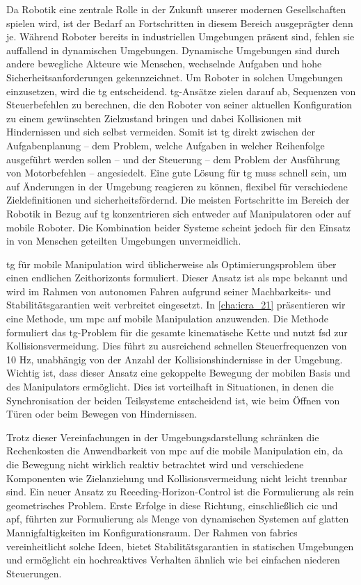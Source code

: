 \acresetall
Da Robotik eine zentrale Rolle in der Zukunft unserer modernen Gesellschaften
spielen wird, ist der Bedarf an Fortschritten in diesem Bereich ausgeprägter
denn je. Während Roboter bereits in industriellen Umgebungen präsent sind,
fehlen sie auffallend in dynamischen Umgebungen. Dynamische Umgebungen sind
durch andere bewegliche Akteure wie Menschen, wechselnde Aufgaben und hohe
Sicherheitsanforderungen gekennzeichnet. Um Roboter in solchen Umgebungen
einzusetzen, wird die \ac{tg} entscheidend. \Ac{tg}-Ansätze zielen darauf ab,
Sequenzen von Steuerbefehlen zu berechnen, die den Roboter von seiner aktuellen
Konfiguration zu einem gewünschten Zielzustand bringen und dabei Kollisionen mit
Hindernissen und sich selbst vermeiden. Somit ist \ac{tg} direkt zwischen der
Aufgabenplanung – dem Problem, welche Aufgaben in welcher Reihenfolge ausgeführt
werden sollen – und der Steuerung – dem Problem der Ausführung von Motorbefehlen
– angesiedelt. Eine gute Lösung für \ac{tg} muss schnell sein, um auf Änderungen
in der Umgebung reagieren zu können, flexibel für verschiedene Zieldefinitionen
und sicherheitsfördernd. Die meisten Fortschritte im Bereich der Robotik in
Bezug auf \ac{tg} konzentrieren sich entweder auf Manipulatoren oder auf mobile
Roboter. Die Kombination beider Systeme scheint jedoch für den Einsatz in von
Menschen geteilten Umgebungen unvermeidlich.

\Ac{tg} für mobile Manipulation wird üblicherweise als Optimierungsproblem über
einen endlichen Zeithorizonts formuliert. Dieser Ansatz ist als \ac{mpc} bekannt
und wird im Rahmen von autonomen Fahren aufgrund seiner Machbarkeits- und
Stabilitätsgarantien weit verbreitet eingesetzt. In \cref{cha:icra_21}
präsentieren wir eine Methode, um \ac{mpc} auf mobile Manipulation anzuwenden.
Die Methode formuliert das \ac{tg}-Problem für die gesamte kinematische Kette
und nutzt \ac{fsd} zur Kollisionsvermeidung. Dies führt zu ausreichend schnellen
Steuerfrequenzen von 10 Hz, unabhängig von der Anzahl der Kollisionshindernisse
in der Umgebung. Wichtig ist, dass dieser Ansatz eine gekoppelte Bewegung der
mobilen Basis und des Manipulators ermöglicht. Dies ist vorteilhaft in
Situationen, in denen die Synchronisation der beiden Teilsysteme entscheidend
ist, wie beim Öffnen von Türen oder beim Bewegen von Hindernissen.

Trotz dieser Vereinfachungen in der Umgebungsdarstellung schränken die
Rechenkosten die Anwendbarkeit von \ac{mpc} auf die mobile Manipulation ein, da
die Bewegung nicht wirklich reaktiv betrachtet wird und verschiedene Komponenten
wie Zielanziehung und Kollisionsvermeidung nicht leicht trennbar sind. Ein neuer
Ansatz zu Receding-Horizon-Control ist die Formulierung als rein
geometrisches Problem. Erste Erfolge in diese Richtung, einschließlich \ac{cic}
und \ac{apf}, führten zur Formulierung als Menge von dynamischen Systemen auf
glatten Mannigfaltigkeiten im Konfigurationsraum. Der Rahmen von \ac{fabrics}
vereinheitlicht solche Ideen, bietet Stabilitätsgarantien in statischen
Umgebungen und ermöglicht ein hochreaktives Verhalten ähnlich wie bei einfachen
niederen Steuerungen.

